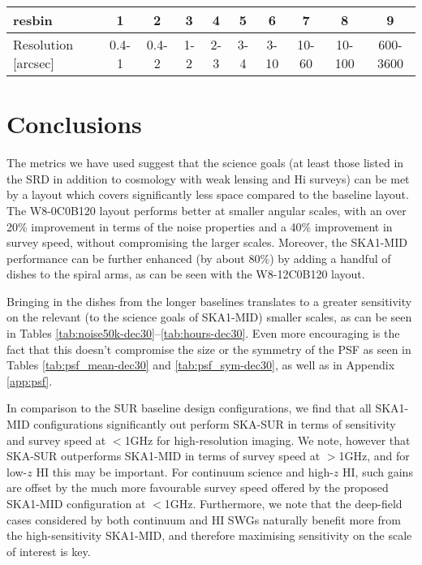 \documentclass[sfheadings,a4paper,times,9pt,floats,floatfix]{article}
\begin{document}


\begin{landscape}
 \begin{table}[H]
  \begin{tabular}{|lccccccccc|}\hline
  resbin & 1 & 2 & 3 & 4 & 5 & 6 & 7 & 8 & 9 \\\hline
  Resolution [arcsec] & 0.4-1 & 0.4-2 & 1-2 & 2-3 & 3-4 & 3-10 & 10-60 & 10-100 & 600-3600 \\\hline
  \end{tabular}
 \end{table}
 

\end{landscape}
\newpage
\section{Conclusions}\label{sec:conclusion}
The metrics we have used suggest that the science goals (at least those listed in the SRD in addition to cosmology with weak
lensing and H{\sc i} surveys) can be met by a layout which covers significantly less space compared to the baseline layout. The
W8-0C0B120 layout performs better at smaller angular scales, with an over 20\% improvement in terms of the noise properties and a
40\% improvement in survey speed, without compromising the larger scales. Moreover, the SKA1-MID performance can be
further enhanced (by about 80\%) by adding a handful of dishes to the spiral arms, as can be seen with the W8-12C0B120
layout.

Bringing in the dishes from the longer baselines translates to a greater sensitivity on the relevant (to the
science goals of SKA1-MID) smaller scales, as can be seen in Tables \ref{tab:noise50k-dec30}--\ref{tab:hours-dec30}. Even
more encouraging is the fact that this doesn't compromise the size or the symmetry of the PSF as seen in Tables
\ref{tab:psf_mean-dec30} and \ref{tab:psf_sym-dec30}, as well as in Appendix \ref{app:psf}.  

In comparison to the SUR baseline design configurations, we find that all SKA1-MID configurations significantly out 
perform SKA-SUR in terms of sensitivity and survey speed at $<$1GHz for high-resolution imaging.  We note, however that 
SKA-SUR outperforms SKA1-MID in terms of survey speed at $>$1GHz, and for low-$z$ HI this may be important. For continuum 
science and high-$z$ HI, such gains are offset by the much more favourable survey speed offered by the proposed SKA1-MID 
configuration at $<$1GHz. Furthermore, we note that the deep-field cases considered by both continuum and HI SWGs naturally 
benefit more from the high-sensitivity SKA1-MID, and therefore maximising sensitivity on the scale of interest is key.
\end{document}
